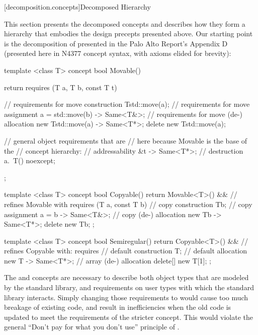[decomposition.concepts]{Decomposed Hierarchy}

\pnum
This section presents the decomposed concepts and describes how they form a hierarchy that
embodies the design precepts presented above. Our starting point is the decomposition of
 presented in the Palo Alto Report's Appendix D (presented here in N4377
concept syntax, with axioms elided for brevity):

\begin{codeblock}
template <class T>
concept bool Movable() {
  return requires (T a, T b, const T t) {
    // requirements for move construction
    T{std::move(a)};
    // requirements for move assignment
    { a = std::move(b) } -> Same<T&>;
    // requirements for move (de-) allocation
    { new T{std::move(a)} } -> Same<T*>;
    delete new T{std::move(a)};

    // general object requirements that are
    // here because Movable is the base of the
    // concept hierarchy:
    // addressability
    { &t } -> Same<T*>;
    // destruction
    { a.~T() } noexcept;
  };
}

template <class T>
concept bool Copyable() {
  return Movable<T>() && // refines Movable with
    requires (T a, const T b) {
      // copy construction
      T{b};
      // copy assignment
      { a = b } -> Same<T&>;
      // copy (de-) allocation
      { new T{b} } -> Same<T*>;
      delete new T{b};
    };
}

template <class T>
concept bool Semiregular() {
  return Copyable<T>() && // refines Copyable with:
    requires {
      // default construction
      T{};
      // default allocation
      { new T{} } -> Same<T*>;
      // array (de-) allocation
      delete[] new T[1];
    };
}
\end{codeblock}
The  and  concepts are necessary to describe both object types
that are modeled by the standard library, and requirements on user types with which the standard
library interacts. Simply changing those requirements to  would cause too
much breakage of existing code, and result in inefficiencies when the old code is updated to meet
the requirements of the stricter concept. This would violate the general ``Don't pay for what you
don't use'' principle of \Cpp.


